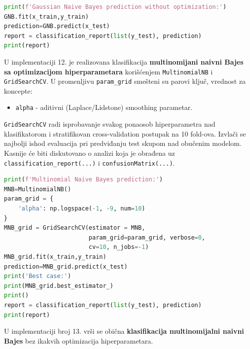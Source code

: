 \documentclass[fontsize=12bp, paper=a4]{scrarticle}
\begin{document}
\begin{lstlisting}[language=Python, caption=Gausov naivni Bajes bez ikakvih optimizacija hiperparametara.]
print(f'Gaussian Naive Bayes prediction without optimization:')
GNB.fit(x_train,y_train)
prediction=GNB.predict(x_test)
report = classification_report(list(y_test), prediction)
print(report)
\end{lstlisting}
U implementaciji 12. je realizovana klasifikacija \textbf{multinomijani naivni Bajes sa optimizacijom hiperparametara} korišćenjem \verb|MultinomialNB|\cite{MNB} i \verb|GridSearchCV|. U promenljivu \verb|param_grid| smešteni su parovi ključ, vrednost za koncepte:
\begin{itemize}
    \item \verb|alpha| - aditivni (Laplace/Lidstone) smoothing parametar.
\end{itemize} 
\verb*|GridSearchCV| radi isprobavanje svakog ponaosob hiperparametra nad klasifikatorom i stratifikovan cross-validation postupak na 10 fold-ova. Izvlači se najbolji ishod evaluacija pri predviđanju test skupom nad obučenim modelom. Kasnije će biti diskutovano o analizi koja je obrađena uz \verb|classification_report(...)| i \verb|confusionMatrix(...)|.
\begin{lstlisting}[language=Python, caption=Multinomialni naivni Bajes sa optimizacijama hiperparametara.]
print(f'Multinomial Naive Bayes prediction:')
MNB=MultinomialNB()
param_grid = {
    'alpha': np.logspace(-1, -9, num=10)
}
MNB_grid = GridSearchCV(estimator = MNB,
						param_grid=param_grid, verbose=0, 									 		
                        cv=10, n_jobs=-1)
MNB_grid.fit(x_train,y_train)
prediction=MNB_grid.predict(x_test)
print('Best case:')
print(MNB_grid.best_estimator_)
print()
report = classification_report(list(y_test), prediction)
print(report)
\end{lstlisting}
U implementaciji broj 13. vrši se obična \textbf{klasifikacija multinomijalni naivni Bajes } bez ikakvih optimizacija hiperparametara.
\end{document}
